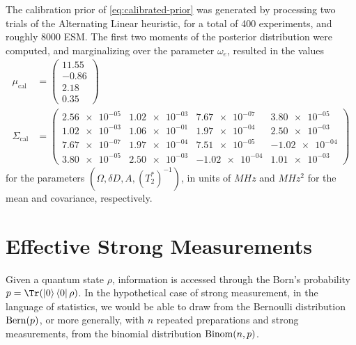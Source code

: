 \documentclass[aps,nofootinbib,twocolumn,superscriptaddress]{revtex4}
\newcommand{\calib}{{\text{cal}}}
\begin{document}
The calibration prior of \autoref{eq:calibrated-prior} was generated
by processing two trials of the Alternating Linear heuristic, for 
a total of 400 experiments, and roughly 8000 ESM.
The first two moments of the posterior distribution were computed, 
and marginalizing over the parameter $\omega_e$, resulted in 
the values
\begin{subequations}
\begin{align}
    \mu_\calib&=\begin{pmatrix}
        11.55 \\ -0.86 \\ 2.18 \\ 0.35
    \end{pmatrix} \\
    \Sigma_\calib&=\begin{pmatrix}
        \num{2.56e-05} & \num{1.02e-03} & \num{7.67e-07} & \num{3.80e-05} \\ 
        \num{1.02e-03} & \num{1.06e-01} & \num{1.97e-04} & \num{2.50e-03} \\ 
        \num{7.67e-07} & \num{1.97e-04} & \num{7.51e-05} & \num{-1.02e-04} \\ 
        \num{3.80e-05} & \num{2.50e-03} & \num{-1.02e-04} & \num{1.01e-03}
        \end{pmatrix}
\end{align}
\end{subequations}
for the parameters $(\Omega,\delta D,A,(T_2^*)^{-1})$, in units
of $\si{MHz}$ and $\si{MHz^2}$ for the mean and covariance, respectively.

\section{Effective Strong Measurements}
\label{apx:effective-strong-measurements}

Given a quantum state $\rho$, 
information is accessed through the
Born's probability $p=\Tr(\ketbra{0}\rho)$.
In the hypothetical case of strong measurement, in the language
of statistics, we would be able to draw from 
the Bernoulli distribution $\operatorname{Bern}(p)$, or more generally, with 
$n$ repeated preparations and strong measurements, from 
the binomial distribution $\operatorname{Binom}(n,p)$.
\end{document}
